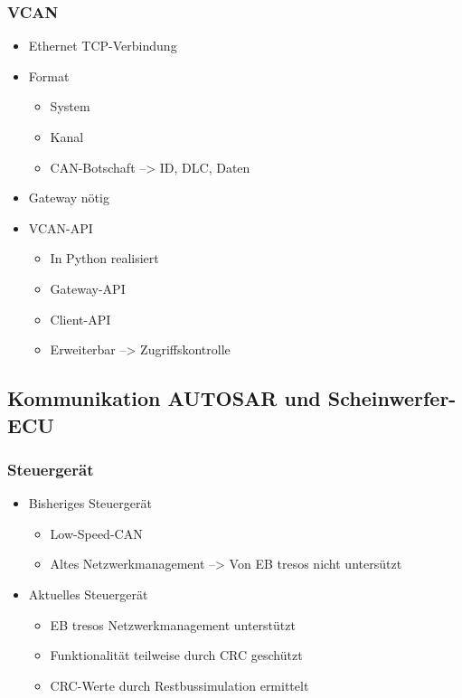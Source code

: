 \documentclass[]{beamer}
\begin{document}
\begin{frame}
\frametitle{VCAN}
    \begin{itemize}
        \item Ethernet TCP-Verbindung
        \item Format
        \begin{itemize}
            \item System
            \item Kanal
            \item CAN-Botschaft --> ID, DLC, Daten
        \end{itemize}        
        \item Gateway nötig
        \item VCAN-API
        \begin{itemize}
            \item In Python realisiert
            \item Gateway-API
            \item Client-API
            \item Erweiterbar --> Zugriffskontrolle
        \end{itemize}
    \end{itemize}
\end{frame}




\subsection{Kommunikation AUTOSAR und Scheinwerfer-ECU}
\begin{frame}
\frametitle{Steuergerät}
    \begin{itemize}
        \item Bisheriges Steuergerät
        \begin{itemize}
            \item Low-Speed-CAN
            \item Altes Netzwerkmanagement --> Von EB tresos nicht untersützt
        \end{itemize}
        \item Aktuelles Steuergerät
        \begin{itemize}
            \item EB tresos Netzwerkmanagement unterstützt
            \item Funktionalität teilweise durch CRC geschützt
            \item CRC-Werte durch Restbussimulation ermittelt
        \end{itemize}
    \end{itemize}
\end{frame}
\end{document}
